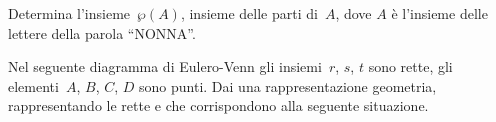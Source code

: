 \begin{multicols}{2}
\begin{esercizio}
\label{ese:7.91}
Determina l'insieme~\(\wp(A)\), insieme delle parti di~\(A\), dove \(A\) è l'insieme 
delle lettere della parola ``NONNA''.
\end{esercizio}

\begin{esercizio}
\label{ese:7.92}
Nel seguente diagramma di Eulero-Venn gli insiemi~\(r\), \(s\), \(t\)
sono rette, gli elementi~\(A\), \(B\), \(C\), \(D\) sono punti. Dai una
rappresentazione geometria, rappresentando le rette e che corrispondono
alla seguente situazione.
\begin{center}
 
\end{center}
\end{esercizio}
\end{multicols}

